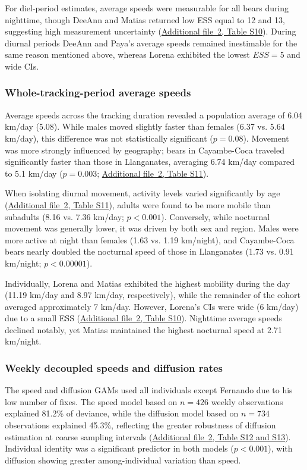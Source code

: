 \documentclass[lineno,referee,pdflatex,sn-vancouver-num]{sn-jnl}%
\theoremstyle{thmstyleone}%
\theoremstyle{thmstyletwo}%
\theoremstyle{thmstylethree}%
\begin{document}
For diel-period estimates, average speeds were measurable for all bears during nighttime, though DeeAnn and Matias returned low ESS equal to 12 and 13, suggesting high measurement uncertainty (\hyperref[S2_File]{Additional file~2, Table S10}). During diurnal periods DeeAnn and Paya's average speeds remained inestimable for the same reason mentioned above, whereas Lorena exhibited the lowest $ESS = 5$ and wide CIs.

\subsubsection{Whole-tracking-period average speeds}

Average speeds across the tracking duration revealed a population average of 6.04 km/day (5.08). While males moved slightly faster than females (6.37 vs. 5.64 km/day), this difference was not statistically significant ($p = 0.08$).
Movement was more strongly influenced by geography; bears in Cayambe-Coca traveled significantly faster than those in Llanganates, averaging 6.74 km/day compared to 5.1 km/day ($ p = 0.003$; \hyperref[S2_File]{Additional file~2, Table S11}).

When isolating diurnal movement, activity levels varied significantly by age (\hyperref[S2_File]{Additional file~2, Table S11}), adults were found to be more mobile than subadults (8.16 vs. 7.36 km/day; $p < 0.001$). Conversely, while nocturnal movement was generally lower, it was driven by both sex and region. Males were more active at night than females (1.63 vs. 1.19 km/night), and Cayambe-Coca bears nearly doubled the nocturnal speed of those in Llanganates (1.73 vs. 0.91 km/night; $p < 0.00001$).

Individually, Lorena and Matias exhibited the highest mobility during the day (11.19 km/day and 8.97 km/day, respectively), while the remainder of the cohort averaged approximately 7 km/day. However, Lorena's CIs were wide (6  km/day) due to a small ESS (\hyperref[S2_File]{Additional file~2, Table S10}). Nighttime average speeds declined notably, yet Matias maintained the highest nocturnal speed at 2.71 km/night.

\subsubsection{Weekly decoupled speeds and diffusion rates}

The speed and diffusion GAMs used all individuals except Fernando due to his low number of fixes. The speed model based on $n = 426$ weekly observations explained 81.2\% of deviance, while the diffusion model based on $n = 734$ observations explained 45.3\%, reflecting the greater robustness of diffusion estimation at coarse sampling intervals (\hyperref[S2_File]{Additional file~2, Table S12 and S13}). Individual identity was a significant predictor in both models ($p < 0.001$), with diffusion showing greater among-individual variation than speed.
\end{document}
